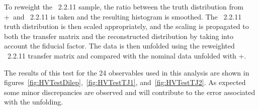 To reweight the \sherpa~2.2.11 sample, the ratio between the truth distribution from \powheg+\pythia~and \sherpa~2.2.11 is taken and the resulting histogram is smoothed. The \sherpa~2.2.11 truth distribution is then scaled appropriately, and the scaling is propagated to both the transfer matrix and the reconstructed distribution by taking into account the fiducial factor.
The data is then unfolded using the reweighted \sherpa~2.2.11 transfer matrix and compared with the nominal data unfolded with \powheg+\pythia.

The results of this test for the 24 observables used in this analysis are shown in figures~\ref{fig:HVTestDilep},~\ref{fig:HVTestTJ1}, and~\ref{fig:HVTestTJ2}. As expected some minor discrepancies are observed and will contribute to the error associated with the unfolding.

